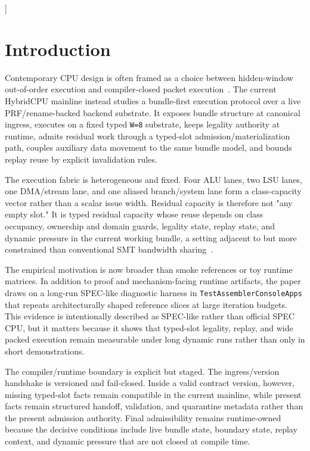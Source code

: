 \documentclass[twocolumn]{article}
\begin{document}
]


\section{Introduction}

Contemporary CPU design is often framed as a choice between hidden-window out-of-order execution and compiler-closed packet execution~\cite{tomasulo1967efficient,palacharla1997complexity,smith1995microarchitecture,fisher1983vliw,wall1991limits,schlansker2000epic}. The current HybridCPU mainline instead studies a bundle-first execution protocol over a live PRF/rename-backed backend substrate. It exposes bundle structure at canonical ingress, executes on a fixed typed \texttt{W=8} substrate, keeps legality authority at runtime, admits residual work through a typed-slot admission/materialization path, couples auxiliary data movement to the same bundle model, and bounds replay reuse by explicit invalidation rules.

The execution fabric is heterogeneous and fixed. Four ALU lanes, two LSU lanes, one DMA/stream lane, and one aliased branch/system lane form a class-capacity vector rather than a scalar issue width. Residual capacity is therefore not "any empty slot." It is typed residual capacity whose reuse depends on class occupancy, ownership and domain guards, legality state, replay state, and dynamic pressure in the current working bundle, a setting adjacent to but more constrained than conventional SMT bandwidth sharing~\cite{tullsen1995smt,kongetira2005niagara}.

The empirical motivation is now broader than smoke references or toy runtime matrices. In addition to proof and mechanism-facing runtime artifacts, the paper draws on a long-run SPEC-like diagnostic harness in \texttt{TestAssemblerConsoleApps} that repeats architecturally shaped reference slices at large iteration budgets. This evidence is intentionally described as SPEC-like rather than official SPEC CPU, but it matters because it shows that typed-slot legality, replay, and wide packed execution remain measurable under long dynamic runs rather than only in short demonstrations.

The compiler/runtime boundary is explicit but staged. The ingress/version handshake is versioned and fail-closed. Inside a valid contract version, however, missing typed-slot facts remain compatible in the current mainline, while present facts remain structured handoff, validation, and quarantine metadata rather than the present admission authority. Final admissibility remains runtime-owned because the decisive conditions include live bundle state, boundary state, replay context, and dynamic pressure that are not closed at compile time.
\end{document}
